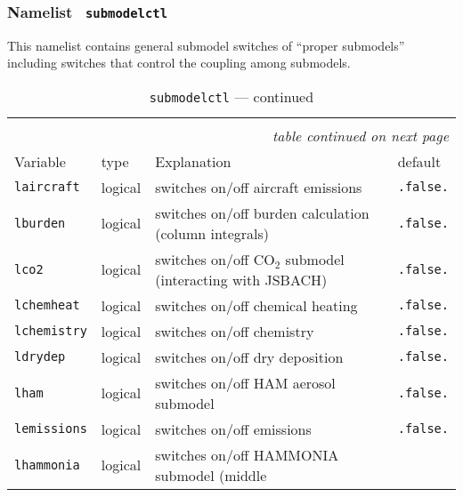 \subsubsection{Namelist {\tt
    submodelctl}}\label{secsubmodelctl} 

This namelist contains general submodel switches of
``proper submodels'' including switches that control the coupling
among submodels. 

\setlength{\LTcapwidth}{\textwidth}
\setlength{\LTleft}{0pt}\setlength{\LTright}{0pt}

\begin{longtable}{l@{\extracolsep\fill}lp{5.0cm}p{3.0cm}}\hline\hline
\caption[Namelist {\tt submodelctl}]{Namelist
  {\tt submodelctl}}\\\hline\label{tabsubmodelctl}
\endfirsthead
\caption[]{{\tt submodelctl} --- continued}\\\hline
\endhead
\hline\multicolumn{4}{r}{\slshape table continued on next page}\\
\endfoot
\hline %
\endlastfoot
Variable & type & Explanation & default \\\hline
{\tt laircraft}\index{namelist variables!laircraft}
 & logical & switches on/off aircraft emissions
  & {\tt .false.} \\
{\tt lburden}\index{namelist variables!lburden}
 & logical & switches on/off burden calculation (column
integrals)
  & {\tt .false.} \\
{\tt lco2}\index{namelist variables!lco2}
 & logical & switches on/off CO$_2$ submodel (interacting
  with JSBACH) & {\tt .false.} \\
{\tt lchemheat}\index{namelist variables!lchemheat}
 & logical & switches on/off chemical heating
  & {\tt .false.} \\
{\tt lchemistry}\index{namelist variables!lchemistry}
 & logical & switches on/off chemistry
  & {\tt .false.} \\
{\tt ldrydep}\index{namelist variables!ldrydep}
 & logical & switches on/off dry deposition
  & {\tt .false.} \\
{\tt lham}\index{namelist variables!lham}
 & logical & switches on/off HAM aerosol submodel &
  {\tt .false.} \\
{\tt lemissions}\index{namelist variables!lemissions}
 & logical & switches on/off emissions
  & {\tt .false.} \\
{\tt lhammonia}\index{namelist variables!lhammonia}
 & logical & switches on/off HAMMONIA submodel (middle

\end{longtable}
